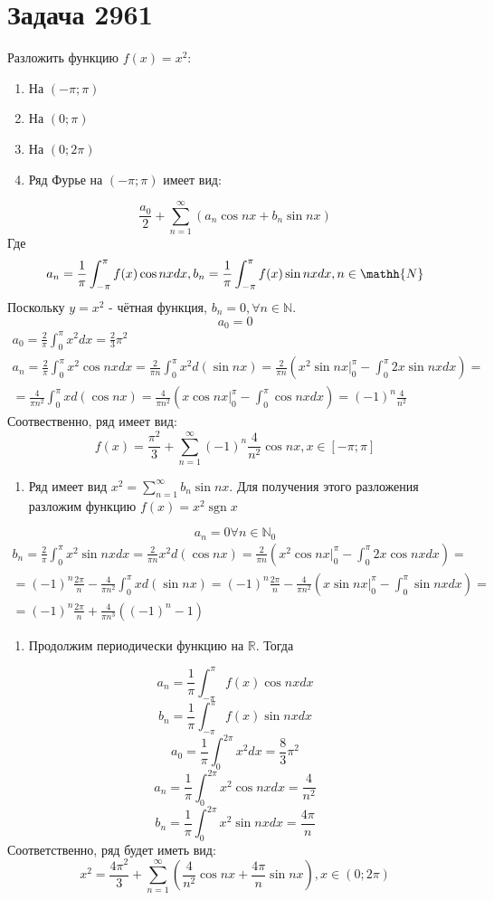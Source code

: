\documentclass[11pt]{article}
\begin{document}
\section{Задача 2961}
\label{sec:org048389f}
Разложить функцию \(f(x) = x^2\):
\begin{enumerate}
\item На \((-\pi; \pi)\)
\item На \((0; \pi)\)
\item На \((0; 2\pi)\)

\item Ряд Фурье на \((-\pi; \pi)\) имеет вид:
\end{enumerate}
$$\frac{a_0}2 + \sum_{n = 1}^\infty(a_n\cos nx + b_n\sin nx)$$
Где
$$a_n = \frac{1}\pi \int_{-\pi}^\pi f(x)\cos nx dx, b_n = \frac{1}\pi \int_{-\pi}^\pi f(x)\sin nx dx, n \in \mathh{N}$$
Поскольку \(y = x^2\) - чётная функция, \(b_n = 0, \forall n \in \mathbb{N}\).
$$a_0 = 0$$
\begin{multline*}
a_0 = \frac{2}\pi \int_0^\pi x^2dx = \frac{2}3\pi^2\\
a_n = \frac{2}\pi \int_0^\pi x^2\cos nx dx = \frac{2}{\pi n}\int_0^\pi x^2d(\sin nx) = \frac{2}{\pi n}\left(x^2\sin nx\bigg|_0^\pi -
\int_0^\pi2x\sin nx dx\right) = \\
 = \frac{4}{\pi n^2}\int_0^\pi xd(\cos nx) = \frac{4}{\pi n^2}\left(x\cos nx\bigg|_0^\pi - \int_0^\pi\cos nxdx\right) = (-1)^{n}\frac{4}{n^2}
\end{multline*}
Соотвественно, ряд имеет вид:
$$f(x) = \frac{\pi^2}{3} + \sum_{n = 1}^\infty(-1)^n\frac{4}{n^2}\cos nx, x \in [-\pi; \pi]$$
\begin{enumerate}
\item Ряд имеет вид \(x^2 = \sum_{n = 1}^\infty b_n\sin nx\). Для получения этого разложения разложим функцию \(f(x) = x^2\operatorname{sgn} x\)
\end{enumerate}
$$a_n = 0 \forall n \in \mathbb{N}_0$$
\begin{multline*}
b_n = \frac{2}\pi\int_0^\pi x^2\sin nxdx = \frac{2}{\pi n} x^2d(\cos nx) = \frac{2}{\pi n}\left(x^2\cos nx\bigg|_0^\pi - \int_0^\pi 2x\cos nxdx\right) = \\
= (-1)^n\frac{2\pi}n - \frac{4}{\pi n^2}\int_0^\pi xd(\sin nx) = (-1)^n\frac{2\pi}n - \frac{4}{\pi n^2}\left(x\sin nx\bigg|_0^\pi - \int_0^\pi\sin nx dx\right) = \\
= (-1)^n\frac{2\pi}n + \frac{4}{\pi n^3}((-1)^n - 1)
\end{multline*}
\begin{enumerate}
\item Продолжим периодически функцию на \(\mathbb{R}\). Тогда
\end{enumerate}
$$a_n = \frac{1}{\pi}\int_{-\pi}^\pi f(x)\cos nxdx$$
$$b_n = \frac{1}{\pi}\int_{-\pi}^\pi f(x)\sin nxdx$$
$$a_0 = \frac{1}\pi\int_0^{2\pi}x^2dx = \frac{8}3\pi^2$$
$$a_n = \frac{1}\pi\int_0^{2\pi}x^2\cos nxdx = \frac{4}{n^2}$$
$$b_n = \frac{1}\pi\int_0^{2\pi}x^2\sin nxdx = \frac{4\pi}n$$
Соответственно, ряд будет иметь вид:
$$x^2 = \frac{4\pi^2}3 + \sum_{n = 1}^\infty\left(\frac{4}{n^2}\cos nx + \frac{4\pi}n\sin nx\right), x \in (0; 2\pi)$$
\end{document}
